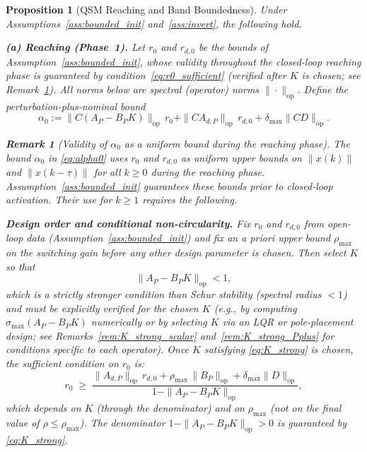 \documentclass[10pt]{amsart}
\numberwithin{equation}{section}
\newtheorem{proposition}[theorem]{Proposition}
\newtheorem{remark}[theorem]{Remark}
\begin{document}
\begin{proposition}[QSM Reaching and Band Boundedness]\label{prop:reaching}
Under Assumptions~\ref{ass:bounded_init} and~\ref{ass:invert}, the following hold.

\noindent\textbf{(a) Reaching (Phase~1).}
Let $r_0$ and $r_{d,0}$ be the bounds of Assumption~\ref{ass:bounded_init},
whose validity throughout the closed-loop reaching phase is guaranteed by
condition~\eqref{eq:r0_sufficient} (verified after $K$ is chosen; see
Remark~\ref{rem:alpha0_validity}).
All norms below are spectral (operator) norms $\|\cdot\|_{\mathrm{op}}$. Define the
perturbation-plus-nominal bound
\begin{equation}\label{eq:alpha0}
  \alpha_0 := \|C(A_P-B_PK)\|_{\mathrm{op}}\,r_0
            + \|CA_{d,P}\|_{\mathrm{op}}\,r_{d,0}
            + \delta_{\max}\|CD\|_{\mathrm{op}}.
\end{equation}

\begin{remark}[Validity of $\alpha_0$ as a uniform bound during the reaching phase]
\label{rem:alpha0_validity}
The bound $\alpha_0$ in \eqref{eq:alpha0} uses $r_0$ and $r_{d,0}$ as uniform upper
bounds on $\|x(k)\|$ and $\|x(k-\tau)\|$ for all $k \geq 0$ during the reaching phase.
Assumption~\ref{ass:bounded_init} guarantees these bounds prior to closed-loop
activation. Their use for $k \geq 1$ requires the following.

\textbf{Design order and conditional non-circularity.}
Fix $r_0$ and $r_{d,0}$ from open-loop data (Assumption~\ref{ass:bounded_init}) and fix
an \emph{a priori} upper bound $\rho_{\max}$ on the switching gain before any other
design parameter is chosen. Then select $K$ so that
\begin{equation}\label{eq:K_strong}
  \|A_P - B_PK\|_{\mathrm{op}} < 1,
\end{equation}
which is a \emph{strictly stronger} condition than Schur stability (spectral radius
$< 1$) and must be explicitly verified for the chosen $K$ (e.g., by computing
$\sigma_{\max}(A_P-B_PK)$ numerically or by selecting $K$ via an LQR or pole-placement
design; see Remarks~\ref{rem:K_strong_scalar} and~\ref{rem:K_strong_Pplus} for
conditions specific to each operator). Once $K$ satisfying \eqref{eq:K_strong} is
chosen, the sufficient condition on $r_0$ is:
\begin{equation}\label{eq:r0_sufficient}
  r_0 \;\geq\; \frac{\|A_{d,P}\|_{\mathrm{op}}\,r_{d,0}
    + \rho_{\max}\,\|B_P\|_{\mathrm{op}} + \delta_{\max}\|D\|_{\mathrm{op}}}
    {1 - \|A_P - B_P K\|_{\mathrm{op}}},
\end{equation}
which depends on $K$ (through the denominator) and on $\rho_{\max}$ (not on the final
value of $\rho \leq \rho_{\max}$). The denominator $1 - \|A_P - B_PK\|_{\mathrm{op}} > 0$
is guaranteed by \eqref{eq:K_strong}.


\end{remark}
\end{proposition}
\end{document}
